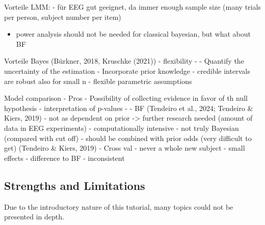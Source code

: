 \documentclass[
  doc,12pt,floatsintext]{apa7}
\providecommand{\tightlist}{%
  \setlength{\itemsep}{0pt}\setlength{\parskip}{0pt}}
\begin{document}
Vorteile LMM:
- für EEG gut geeignet, da immer enough sample size (many trials per person, subject number per item)

\begin{itemize}
\tightlist
\item
  power analysis should not be needed for classical bayesian, but what about BF
\end{itemize}

Vorteile Bayes (Bürkner, 2018, Kruschke (2021))
- flexibility
-
- Quantify the uncertainty of the estimation
- Incorporate prior knowledge
- credible intervals are robust also for small n
- flexible parametric assumptions

Model comparison
- Pros
- Possibility of collecting evidence in favor of th null hypothesis
- interpretation of p-values
-
- BF (Tendeiro et al., 2024; Tendeiro \& Kiers, 2019)
- not as dependent on prior -\textgreater{} further research needed (amount of data in EEG experiments)
- computationally intensive
- not truly Bayesian (compared with cut off)
- should be combined with prior odds (very difficult to get) (Tendeiro \& Kiers, 2019)
- Cross val
- never a whole new subject
- small effects
- difference to BF
- inconsistent

\subsection{Strengths and Limitations}\label{strengths-and-limitations}

Due to the introductory nature of this tutorial, many topics could not be presented in depth.
\end{document}
